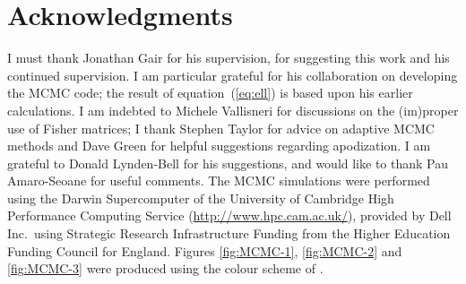 \documentclass[a4paper, 10pt, titlepage, twoside]{article}
\newcommand{\eqnref}[1]{equation~(\ref{eq:#1})}
\begin{document}
\setcounter{page}{1}


\section*{Acknowledgments}

I must thank Jonathan Gair for his supervision, for suggesting this work and his continued supervision. I am particular grateful for his collaboration on developing the MCMC code; the result of \eqnref{ell} is based upon his earlier calculations. I am indebted to Michele Vallisneri for discussions on the (im)proper use of Fisher matrices; I thank Stephen Taylor for advice on adaptive MCMC methods and Dave Green for helpful suggestions regarding apodization. I am grateful to Donald Lynden-Bell for his suggestions, and would like to thank Pau Amaro-Seoane for useful comments. The MCMC simulations were performed using the Darwin Supercomputer of the University of Cambridge High Performance Computing Service (\url{http://www.hpc.cam.ac.uk/}), provided by Dell Inc.\ using Strategic Research Infrastructure Funding from the Higher Education Funding Council for England. Figures \ref{fig:MCMC-1}, \ref{fig:MCMC-2} and \ref{fig:MCMC-3} were produced using the colour scheme of \citet{Green2011}.

\newpage





\end{document}
